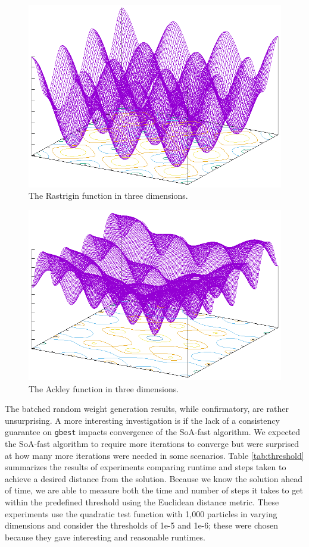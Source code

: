 \begin{figure}
  \includegraphics[width=\columnwidth]{../img/output/rastrigin}
  \caption{The Rastrigin function in three dimensions.}\label{fig:rastrigin}
\end{figure}

\begin{figure}
  \includegraphics[width=\columnwidth]{../img/output/ackley}
  \caption{The Ackley function in three dimensions.}\label{fig:ackley}
\end{figure}

The batched random weight generation results, while confirmatory, are rather
unsurprising. A more interesting investigation is if the lack of a
consistency guarantee on \texttt{gbest} impacts convergence of the SoA-fast algorithm. We
expected the SoA-fast algorithm to require more iterations to converge
but were surprised at how many more iterations were needed in some
scenarios. Table \ref{tab:threshold} summarizes the results of experiments
comparing runtime and steps taken to achieve a desired distance from the
solution. Because we know the solution ahead of time, we are able to measure
both the time and number of steps it
takes to get within the predefined threshold using the
Euclidean distance metric. These experiments use the quadratic test
function with 1,000 particles in varying dimensions and
consider the thresholds of 1e-5 and 1e-6; these were chosen because they
gave interesting and reasonable runtimes.


